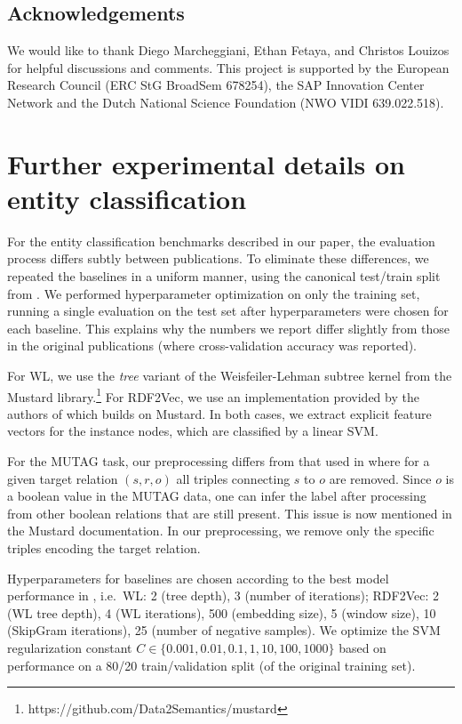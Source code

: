 \documentclass[letterpaper]{article} \usepackage{aaai18}  \usepackage{times}  \usepackage{helvet}  \usepackage{courier}  \usepackage{url}  \usepackage{graphicx}  \frenchspacing
\begin{document}
\subsection*{Acknowledgements}
We would like to thank Diego Marcheggiani, Ethan Fetaya, and Christos Louizos for helpful discussions and comments.
This project is supported by the European Research Council (ERC StG BroadSem 678254), the SAP Innovation
Center Network
and the Dutch National Science Foundation (NWO VIDI 639.022.518).




\newpage
\onecolumn
\setlength{\parskip}{0.5em}
\appendix
\section*{Further experimental details on entity classification}
\vspace{2em}

For the entity classification benchmarks described in our paper, the evaluation process differs subtly between publications. To eliminate these differences, we repeated the baselines in a uniform manner, using the canonical test/train split from \cite{ristoski2016collection}. We performed hyperparameter optimization on only the training set, running a single evaluation on the test set after hyperparameters were chosen for each baseline. This explains why the numbers we report differ slightly from those in the original publications (where cross-validation accuracy was reported).

For WL, we use the \textit{tree} variant of the Weisfeiler-Lehman subtree kernel from the Mustard library.\footnote{https://github.com/Data2Semantics/mustard}
For RDF2Vec, we use an implementation provided by the authors of \cite{ristoski2016rdf2vec} which builds on Mustard. In both cases, we extract explicit feature vectors for the instance nodes, which are classified by a linear SVM.

For the MUTAG task, our preprocessing differs from that used in \cite{de2015substructure,ristoski2016rdf2vec} where for a given target relation $(s, r, o)$ all triples connecting $s$ to $o$ are removed. Since $o$ is a boolean value in the MUTAG data, one can infer the label after processing from other boolean relations that are still present. This issue is now mentioned in the Mustard documentation. In our preprocessing, we remove only the specific triples encoding the target relation.

Hyperparameters for baselines are chosen according to the best model performance in \cite{ristoski2016rdf2vec}, i.e.~WL: 2 (tree depth), 3 (number of iterations); RDF2Vec: 2 (WL tree depth), 4 (WL iterations), 500 (embedding size), 5 (window size), 10 (SkipGram iterations), 25 (number of negative samples). We optimize the SVM regularization constant $C\in\{0.001, 0.01, 0.1, 1, 10, 100, 1000\}$ based on performance on a 80/20 train/validation split (of the original training set).
\end{document}
